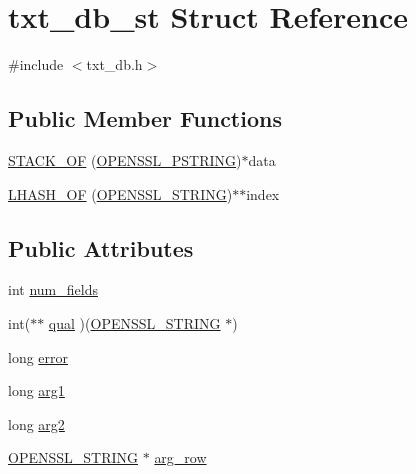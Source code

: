 \hypertarget{structtxt__db__st}{}\section{txt\+\_\+db\+\_\+st Struct Reference}
\label{structtxt__db__st}


{\ttfamily \#include $<$txt\+\_\+db.\+h$>$}

\subsection*{Public Member Functions}
\begin{DoxyCompactItemize}
\item 
\hyperlink{structtxt__db__st_a958a380d2e5b16f19c46f4b619be7bbd}{S\+T\+A\+C\+K\+\_\+\+OF} (\hyperlink{txt__db_8h_a6a35660313db49640015c0c4fc06676a}{O\+P\+E\+N\+S\+S\+L\+\_\+\+P\+S\+T\+R\+I\+NG})$\ast$data
\item 
\hyperlink{structtxt__db__st_a66bdaf7f42a43b4c92d25c0e1044f17e}{L\+H\+A\+S\+H\+\_\+\+OF} (\hyperlink{safestack_8h_a0c7cad03962a61035f753d64e05503e3}{O\+P\+E\+N\+S\+S\+L\+\_\+\+S\+T\+R\+I\+NG})$\ast$$\ast$index
\end{DoxyCompactItemize}
\subsection*{Public Attributes}
\begin{DoxyCompactItemize}
\item 
int \hyperlink{structtxt__db__st_ac5e40d76de4af9e3eb8126c5c71f35ee}{num\+\_\+fields}
\item 
int($\ast$$\ast$ \hyperlink{structtxt__db__st_af87dc62965306c802fc5d25b33eb0ffd}{qual} )(\hyperlink{safestack_8h_a0c7cad03962a61035f753d64e05503e3}{O\+P\+E\+N\+S\+S\+L\+\_\+\+S\+T\+R\+I\+NG} $\ast$)
\item 
long \hyperlink{structtxt__db__st_addce5883079df416612638f30157ba9d}{error}
\item 
long \hyperlink{structtxt__db__st_ae3f2f91927e152a865eecf288a8a5190}{arg1}
\item 
long \hyperlink{structtxt__db__st_ae99864667eb99fd2d18fc91293df6249}{arg2}
\item 
\hyperlink{safestack_8h_a0c7cad03962a61035f753d64e05503e3}{O\+P\+E\+N\+S\+S\+L\+\_\+\+S\+T\+R\+I\+NG} $\ast$ \hyperlink{structtxt__db__st_a67601c6116a02bdb8ca45dc529da3255}{arg\+\_\+row}
\end{DoxyCompactItemize}


